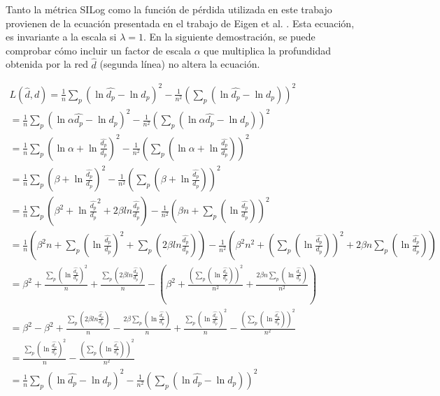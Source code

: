 \label{demostracion}

Tanto la métrica SILog como la función de pérdida utilizada en este trabajo provienen de la ecuación presentada en el trabajo de Eigen et al. \cite{eigen-multi-scale}. Esta ecuación, es invariante a la escala si $\lambda=1$. En la siguiente demostración, se puede comprobar cómo incluir un factor de escala $\alpha$ que multiplica la profundidad obtenida por la red $\hat{d}$ (segunda línea) no altera la ecuación.

\begin{align*}
    L(\hat{d}, d) = \frac{1}{n}\sum_{p} (\ln{\hat{d_p}} - \ln{d_p})^2 - \frac{1}{n^2} \left( \sum_{p} (\ln{\hat{d_p}} - \ln{d_p}) \right)^2 \\
    = \frac{1}{n}\sum_{p} (\ln{\alpha \hat{d_p}} - \ln{d_p})^2 - \frac{1}{n^2} \left( \sum_{p} (\ln{\alpha \hat{d_p}} - \ln{d_p}) \right)^2 \\
    = \frac{1}{n}\sum_{p} (\ln{\alpha} + \ln{\frac{\hat{d_p}}{d_p}})^2 - \frac{1}{n^2} \left( \sum_{p} (\ln{\alpha} + \ln{\frac{\hat{d_p}}{d_p}}) \right)^2 \\
    = \frac{1}{n}\sum_{p} (\beta + \ln{\frac{\hat{d_p}}{d_p}})^2 - \frac{1}{n^2} \left( \sum_{p} (\beta + \ln{\frac{\hat{d_p}}{d_p}}) \right)^2 \\
    = \frac{1}{n}\sum_{p} (\beta^2 + \ln{\frac{\hat{d_p}}{d_p}}^2 + 2 \beta ln{\frac{\hat{d_p}}{d_p}}) - \frac{1}{n^2} \left( \beta n + \sum_{p} (\ln{\frac{\hat{d_p}}{d_p}}) \right)^2 \\
    = \frac{1}{n} (\beta^2 n + \sum_{p}(\ln{\frac{\hat{d_p}}{d_p}})^2 + \sum_{p}(2 \beta ln{\frac{\hat{d_p}}{d_p}})) - \frac{1}{n^2} \left( \beta^2 n^2 + (\sum_{p} (\ln{\frac{\hat{d_p}}{d_p}}))^2 + 2 \beta n \sum_{p} (\ln{\frac{\hat{d_p}}{d_p}}) \right) \\
    = \beta^2 + \frac{\sum_{p}(\ln{\frac{\hat{d_p}}{d_p}})^2}{n} + \frac{\sum_{p}(2 \beta ln{\frac{\hat{d_p}}{d_p}})}{n} - \left( \beta^2 + \frac{(\sum_{p} (\ln{\frac{\hat{d_p}}{d_p}}))^2}{n^2} + \frac{2 \beta n \sum_{p} (\ln{\frac{\hat{d_p}}{d_p}})}{n^2} \right) \\
    = \beta^2 - \beta^2 + \frac{\sum_{p}(2 \beta ln{\frac{\hat{d_p}}{d_p}})}{n} - \frac{2 \beta \sum_{p} (\ln{\frac{\hat{d_p}}{d_p}})}{n} + \frac{\sum_{p}(\ln{\frac{\hat{d_p}}{d_p}})^2}{n} - \frac{(\sum_{p} (\ln{\frac{\hat{d_p}}{d_p}}))^2}{n^2} \\
    = \frac{\sum_{p}(\ln{\frac{\hat{d_p}}{d_p}})^2}{n} - \frac{(\sum_{p} (\ln{\frac{\hat{d_p}}{d_p}}))^2}{n^2} \\
    = \frac{1}{n}\sum_{p} (\ln{\hat{d_p}} - \ln{d_p})^2 - \frac{1}{n^2} \left( \sum_{p} (\ln{\hat{d_p}} - \ln{d_p}) \right)^2 \\
\end{align*}